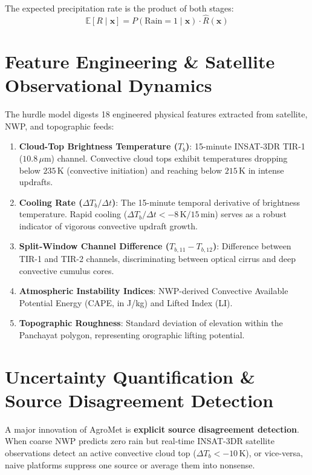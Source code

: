 \documentclass[11pt,a4paper,oneside]{report}
\begin{document}
The expected precipitation rate is the product of both stages:
\begin{equation}
\mathbb{E}[R \mid \mathbf{x}] = P(\text{Rain}=1 \mid \mathbf{x}) \cdot \hat{R}(\mathbf{x})
\end{equation}

\section{Feature Engineering \& Satellite Observational Dynamics}
The hurdle model digests 18 engineered physical features extracted from satellite, NWP, and topographic feeds:
\begin{enumerate}[leftmargin=*]
    \item \textbf{Cloud-Top Brightness Temperature ($T_b$)}: 15-minute INSAT-3DR TIR-1 ($10.8\,\mu\text{m}$) channel. Convective cloud tops exhibit temperatures dropping below $235\,\text{K}$ (convective initiation) and reaching below $215\,\text{K}$ in intense updrafts.
    \item \textbf{Cooling Rate ($\Delta T_b / \Delta t$)}: The 15-minute temporal derivative of brightness temperature. Rapid cooling ($\Delta T_b / \Delta t < -8\,\text{K}/15\,\text{min}$) serves as a robust indicator of vigorous convective updraft growth.
    \item \textbf{Split-Window Channel Difference ($T_{b,11} - T_{b,12}$)}: Difference between TIR-1 and TIR-2 channels, discriminating between optical cirrus and deep convective cumulus cores.
    \item \textbf{Atmospheric Instability Indices}: NWP-derived Convective Available Potential Energy (CAPE, in J/kg) and Lifted Index (LI).
    \item \textbf{Topographic Roughness}: Standard deviation of elevation within the Panchayat polygon, representing orographic lifting potential.
\end{enumerate}

\section{Uncertainty Quantification \& Source Disagreement Detection}
A major innovation of AgroMet is \textbf{explicit source disagreement detection}. When coarse NWP predicts zero rain but real-time INSAT-3DR satellite observations detect an active convective cloud top ($\Delta T_b < -10\,\text{K}$), or vice-versa, naive platforms suppress one source or average them into nonsense.
\end{document}
